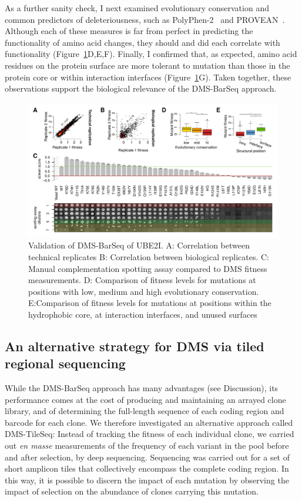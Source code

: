 As a further sanity check, I next examined evolutionary conservation and common predictors of deleteriousness, such as PolyPhen-2~\cite{adzhubei_predicting_2001} and PROVEAN~\cite{choi_predicting_2012}.  Although each of these measures is far from perfect in predicting the functionality of amino acid changes, they should and did each correlate with functionality (Figure~\ref{fig:barseqValidation}D,E,F). Finally, I confirmed that, as expected, amino acid residues on the protein surface are more tolerant to mutation than those in the protein core or within interaction interfaces (Figure~\ref{fig:barseqValidation}G).  Taken together, these observations support the biological relevance of the DMS-BarSeq approach.

\begin{landscape}
\begin{figure}
	\centering
	\includegraphics[width=9in]{img/barseq-validation.pdf}
	\caption{Validation of DMS-BarSeq of UBE2I. A: Correlation between technical replicates B: Correlation between biological replicates. C: Manual complementation spotting assay compared to DMS fitness measurements. D: Comparison of fitness levels for mutations at positions with low, medium and high evolutionary conservation. E:Comparison of fitness levels for mutations at positions within the hydrophobic core, at interaction interfaces, and unused surfaces}
	\label{fig:barseqValidation}
\end{figure}
\end{landscape}


\subsection{An alternative strategy for DMS via tiled regional sequencing}

While the DMS-BarSeq approach has many advantages (see Discussion), its performance comes at the cost of producing and maintaining an arrayed clone library, and of determining the full-length sequence of each coding region and barcode for each clone. We therefore investigated an alternative approach called DMS-TileSeq: Instead of tracking the fitness of each individual clone, we carried out \textit{en masse} measurements of the frequency of each variant in the pool before and after selection, by deep sequencing.  Sequencing was carried out for a set of short amplicon tiles that collectively encompass the complete coding region.  In this way, it is possible to discern the impact of each mutation by observing the impact of selection on the abundance of clones carrying this mutation.

